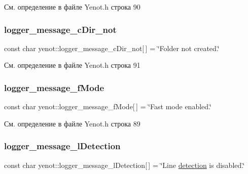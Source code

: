 См. определение в файле Yenot.\+h строка 90

\mbox{\label{namespaceyenot_a16669256cbc1918ac8500a364e0ba21d}} 
\subsubsection{\texorpdfstring{logger\+\_\+message\+\_\+c\+Dir\+\_\+not}{logger\_message\_cDir\_not}}
{\footnotesize\ttfamily const char yenot\+::logger\+\_\+message\+\_\+c\+Dir\+\_\+not\mbox{[}$\,$\mbox{]} = \char`\"{}Folder not created.\char`\"{}}



См. определение в файле Yenot.\+h строка 91

\mbox{\label{namespaceyenot_a5cb3756995a6e5a93819405ca99eb35a}} 
\subsubsection{\texorpdfstring{logger\+\_\+message\+\_\+f\+Mode}{logger\_message\_fMode}}
{\footnotesize\ttfamily const char yenot\+::logger\+\_\+message\+\_\+f\+Mode\mbox{[}$\,$\mbox{]} = \char`\"{}Fast mode enabled.\char`\"{}}



См. определение в файле Yenot.\+h строка 89

\mbox{\label{namespaceyenot_a7ba035b0bd5ec0ca88a1741671cf6818}} 
\subsubsection{\texorpdfstring{logger\+\_\+message\+\_\+l\+Detection}{logger\_message\_lDetection}}
{\footnotesize\ttfamily const char yenot\+::logger\+\_\+message\+\_\+l\+Detection\mbox{[}$\,$\mbox{]} = \char`\"{}Line \mbox{\hyperlink{_core_8h_a0ef39a5ada0921b3abf8906957746b86}{detection}} is disabled.\char`\"{}}



